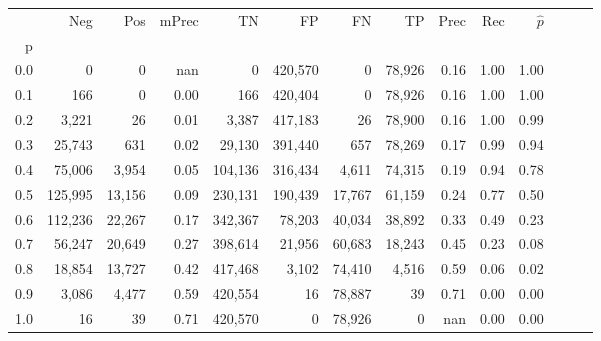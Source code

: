 \begin{tabular}{rrrrrrrrrrrrrr}
\toprule
{} &      Neg &     Pos & mPrec &       TN &       FP &      FN &      TP &  Prec &   Rec & $\hat{p}$ \\
p   &          &         &       &          &          &         &         &       &       &           \\
\midrule
0.0 &        0 &       0 &   nan &        0 &  420,570 &       0 &  78,926 &  0.16 &  1.00 &      1.00 \\
0.1 &      166 &       0 &  0.00 &      166 &  420,404 &       0 &  78,926 &  0.16 &  1.00 &      1.00 \\
0.2 &    3,221 &      26 &  0.01 &    3,387 &  417,183 &      26 &  78,900 &  0.16 &  1.00 &      0.99 \\
0.3 &   25,743 &     631 &  0.02 &   29,130 &  391,440 &     657 &  78,269 &  0.17 &  0.99 &      0.94 \\
0.4 &   75,006 &   3,954 &  0.05 &  104,136 &  316,434 &   4,611 &  74,315 &  0.19 &  0.94 &      0.78 \\
0.5 &  125,995 &  13,156 &  0.09 &  230,131 &  190,439 &  17,767 &  61,159 &  0.24 &  0.77 &      0.50 \\
0.6 &  112,236 &  22,267 &  0.17 &  342,367 &   78,203 &  40,034 &  38,892 &  0.33 &  0.49 &      0.23 \\
0.7 &   56,247 &  20,649 &  0.27 &  398,614 &   21,956 &  60,683 &  18,243 &  0.45 &  0.23 &      0.08 \\
0.8 &   18,854 &  13,727 &  0.42 &  417,468 &    3,102 &  74,410 &   4,516 &  0.59 &  0.06 &      0.02 \\
0.9 &    3,086 &   4,477 &  0.59 &  420,554 &       16 &  78,887 &      39 &  0.71 &  0.00 &      0.00 \\
1.0 &       16 &      39 &  0.71 &  420,570 &        0 &  78,926 &       0 &   nan &  0.00 &      0.00 \\
\bottomrule
\end{tabular}
